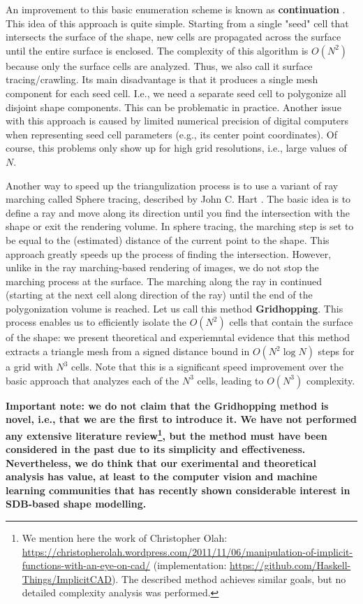 \documentclass[11pt,twocolumn]{article}
\begin{document}
		An improvement to this basic enumeration scheme is known as \textbf{continuation} \cite{unchainedgeometry}.
		This idea of this approach is quite simple.
		Starting from a single "seed" cell that intersects the surface of the shape, new cells are propagated across the surface until the entire surface is enclosed.
		The complexity of this algorithm is $O(N^2)$ because only the surface cells are analyzed.
		Thus, we also call it surface tracing/crawling.
		Its main disadvantage is that it produces a single mesh component for each seed cell.
		I.e., we need a separate seed cell to polygonize all disjoint shape components.
		This can be problematic in practice.
		Another issue with this approach is caused by limited numerical precision of digital computers when representing seed cell parameters
		(e.g., its center point coordinates).
		Of course, this problems only show up for high grid resolutions, i.e., large values of $N$.

		Another way to speed up the triangulization process is to use a variant of ray marching called Sphere tracing, described by John C. Hart \cite{HartEtAl89rtfractals,Hart94spheretracing}.
		The basic idea is to define a ray and move along its direction until you find the intersection with the shape or exit the rendering volume.
		In sphere tracing, the marching step is set to be equal to the (estimated) distance of the current point to the shape.
		This approach greatly speeds up the process of finding the intersection.
		However, unlike in the ray marching-based rendering of images, we do not stop the marching process at the surface.
		The marching along the ray in continued (starting at the next cell along direction of the ray) until the end of the polygonization volume is reached.
		Let us call this method \textbf{Gridhopping}.
		This process enables us to efficiently isolate the $O(N^2)$ cells that contain the surface of the shape:
		we present theoretical and experiemntal evidence that this method extracts a triangle mesh from a signed distance bound in $O(N^2\log N)$ steps for a grid with $N^3$ cells.
		Note that this is a significant speed improvement over the basic approach that analyzes each of the $N^3$ cells, leading to $O(N^3)$ complexity.

		\textbf
		{
		Important note: we do not claim that the Gridhopping method is novel, i.e., that we are the first to introduce it.
		We have not performed any extensive literature review\footnote{We mention here the work of Christopher Olah: \url{https://christopherolah.wordpress.com/2011/11/06/manipulation-of-implicit-functions-with-an-eye-on-cad/} (implementation: \url{https://github.com/Haskell-Things/ImplicitCAD}). The described method achieves similar goals, but no detailed complexity analysis was performed.},
		but the method must have been considered in the past due to its simplicity and effectiveness.
		Nevertheless, we do think that our exerimental and theoretical analysis has value,
		at least to the computer vision and machine learning communities that has recently shown considerable interest in SDB-based shape modelling.
		}
\end{document}
